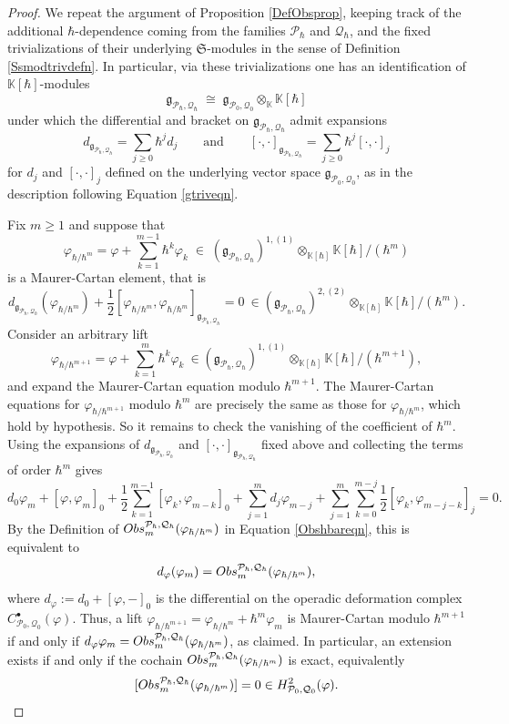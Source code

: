 \documentclass[10pt,a4paper]{amsart}
\newcommand{\Kh}{{\K[\hbar]}}
\newcommand{\K}{{\bb K}}
\newcommand{\Obs}{{\textup{Obs}}}
\newcommand{\Ph}{{\mathcal{P}_\hbar}}
\newcommand{\Qh}{{\mathcal{Q}_\hbar}}
\newcommand{\Ss}{{{\mf{S}}}}
\newcommand{\bb}{\mathbb}
\newcommand{\gPQh}{{\mathfrak{g}_{\mc P_\hbar,\mc Q_\hbar}}}
\newcommand{\g}{{\mf{g}}}
\newcommand{\mc}{\mathcal}
\newcommand{\mf}{\mathfrak}
\begin{document}
\begin{proof}
We repeat the argument of Proposition \ref{DefObsprop}, keeping track of the additional $\hbar$-dependence coming from the families $\Ph$ and $\Qh$, and the fixed trivializations of their underlying $\Ss$-modules in the sense of Definition \ref{Ssmodtrivdefn}. In particular, via these trivializations one has an identification of $\Kh$-modules
\[
\gPQh \;\cong\; \g_{\mc P_0,\mc Q_0}\otimes_\K \Kh
\]
under which the differential and bracket on $\gPQh$ admit expansions
\[
d_{\gPQh}=\sum_{j\ge 0}\hbar^j d_j
\qquad\text{and}\qquad
[\cdot,\cdot]_{\gPQh}=\sum_{j\ge 0}\hbar^j[\cdot,\cdot]_j
\]
for $d_j$ and $[\cdot,\cdot]_j$ defined on the underlying vector space $\g_{\mc P_0,\mc Q_0}$, as in the description following Equation \ref{gtriveqn}.

Fix $m\ge 1$ and suppose that
\[
\varphi_{\hbar/\hbar^m}=\varphi+\sum_{k=1}^{m-1}\hbar^k\varphi_k
\;\in\;(\gPQh)^{1,(1)}\otimes_{\Kh}\Kh/(\hbar^m)
\]
is a Maurer-Cartan element, that is
\[
d_{\gPQh}(\varphi_{\hbar/\hbar^m})
+\frac12[\varphi_{\hbar/\hbar^m},\varphi_{\hbar/\hbar^m}]_{\gPQh}= 0 \ \in (\gPQh)^{2,(2)}\otimes_{\Kh}\Kh/(\hbar^{m}).
\]
Consider an arbitrary lift
\[
\varphi_{\hbar/\hbar^{m+1}}
=\varphi+\sum_{k=1}^{m}\hbar^k\varphi_k
\ \in (\gPQh)^{1,(1)}\otimes_{\Kh}\Kh/(\hbar^{m+1}),
\]
and expand the Maurer-Cartan equation modulo $\hbar^{m+1}$. The Maurer-Cartan equations for $\varphi_{\hbar/\hbar^{m+1}}$ modulo $\hbar^m$ are precisely the same as those for $\varphi_{\hbar/\hbar^{m}}$, which hold by hypothesis. So it remains to check the vanishing of the coefficient of $\hbar^m$. Using the expansions of $d_{\gPQh}$ and $[\cdot,\cdot]_{\gPQh}$ fixed above and collecting the terms of order $\hbar^m$ gives
\[
d_0\varphi_m+[\varphi,\varphi_m]_0
+\frac12\sum_{k=1}^{m-1}[\varphi_k,\varphi_{m-k}]_0
+\sum_{j=1}^m d_j\varphi_{m-j}
+\sum_{j=1}^m\sum_{k=0}^{m-j}\frac12[\varphi_k,\varphi_{m-j-k}]_j
=0.
\]
By the Definition of $\Obs_m^{\Ph,\Qh}(\varphi_{\hbar/\hbar^m})$ in Equation \ref{Obshbareqn}, this is equivalent to
\begin{equation}\label{defMChbareqn}
	d_\varphi(\varphi_m)=\Obs_m^{\Ph,\Qh}(\varphi_{\hbar/\hbar^m}),
\end{equation}
where $d_\varphi:=d_0+[\varphi,-]_0$ is the differential on the operadic deformation complex
$C^\bullet_{\mc P_0,\mc Q_0}(\varphi)$. Thus, a lift $\varphi_{\hbar/\hbar^{m+1}}=\varphi_{\hbar/\hbar^m}+\hbar^m\varphi_m$ is Maurer-Cartan
modulo $\hbar^{m+1}$ if and only if $d_\varphi\varphi_m=\Obs_m^{\Ph,\Qh}(\varphi_{\hbar/\hbar^m})$, as claimed. In particular, an extension exists if and only if the cochain
$\Obs_m^{\Ph,\Qh}(\varphi_{\hbar/\hbar^m})$ is exact, equivalently
\[
[\Obs_m^{\Ph,\Qh}(\varphi_{\hbar/\hbar^m})]=0\in H^2_{\mc P_0,\mc Q_0}(\varphi).
\]




\end{proof}
\end{document}
